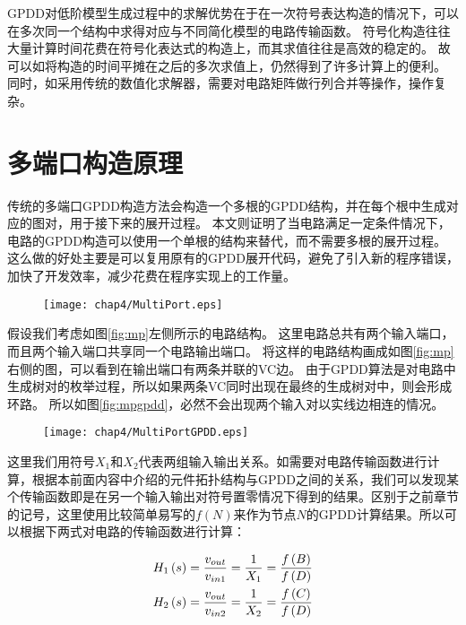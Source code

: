 GPDD对低阶模型生成过程中的求解优势在于在一次符号表达构造的情况下，可以在多次同一个结构中求得对应与不同简化模型的电路传输函数。
符号化构造往往大量计算时间花费在符号化表达式的构造上，而其求值往往是高效的稳定的。
故可以如将构造的时间平摊在之后的多次求值上，仍然得到了许多计算上的便利。
同时，如采用传统的数值化求解器，需要对电路矩阵做行列合并等操作，操作复杂。

\section{多端口构造原理}
\label{sec:mp}

传统的多端口GPDD构造方法会构造一个多根的GPDD结构，并在每个根中生成对应的图对，用于接下来的展开过程\parencite{GShi-GPDD-2013}。
本文则证明了当电路满足一定条件情况下，电路的GPDD构造可以使用一个单根的结构来替代，而不需要多根的展开过程。
这么做的好处主要是可以复用原有的GPDD展开代码，避免了引入新的程序错误，加快了开发效率，减少花费在程序实现上的工作量。

\begin{figure}[!htp]
	\centering
	\texttt{[image: chap4/MultiPort.eps]}
\end{figure}

假设我们考虑如图\ref{fig:mp}左侧所示的电路结构。
这里电路总共有两个输入端口，而且两个输入端口共享同一个电路输出端口。
将这样的电路结构画成如图\ref{fig:mp}右侧的图，可以看到在输出端口有两条并联的VC边。
由于GPDD算法是对电路中生成树对的枚举过程，所以如果两条VC同时出现在最终的生成树对中，则会形成环路。
所以如图\ref{fig:mpgpdd}，必然不会出现两个输入对以实线边相连的情况。

\begin{figure}[!htp]
	\centering
	\texttt{[image: chap4/MultiPortGPDD.eps]}
\end{figure}

这里我们用符号$X_1$和$X_2$代表两组输入输出关系。如需要对电路传输函数进行计算，根据本前面内容中介绍的元件拓扑结构与GPDD之间的关系，我们可以发现某个传输函数即是在另一个输入输出对符号置零情况下得到的结果。区别于之前章节的记号，这里使用比较简单易写的$f\left( N \right)$来作为节点$N$的GPDD计算结果。所以可以根据下两式对电路的传输函数进行计算：

\begin{eqnarray}
{H_1}\left( s \right) = \frac{{{v_{out}}}}
{{{v_{in1}}}} = \frac{1}
{{{X_1}}} = \frac{{f\left( B \right)}}
{{f\left( D \right)}} \hfill \\
{H_2}\left( s \right) = \frac{{{v_{out}}}}
{{{v_{in2}}}} = \frac{1}
{{{X_2}}} = \frac{{f\left( C \right)}}
{{f\left( D \right)}} \hfill 
\end{eqnarray}

